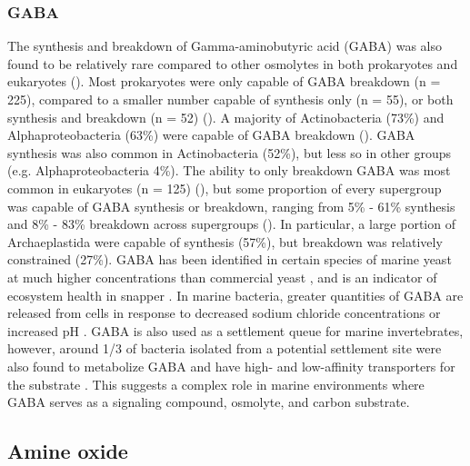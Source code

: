 \documentclass[utf8]{frontiersSCNS} %
\begin{document}
\subsubsection*{GABA}
The synthesis and breakdown of Gamma-aminobutyric acid (GABA) was also found to be relatively rare compared to other osmolytes in both prokaryotes and eukaryotes (). Most prokaryotes were only capable of GABA breakdown (n = 225), compared to a smaller number capable of synthesis only (n = 55), or both synthesis and breakdown (n = 52) (). A majority of Actinobacteria (73\%) and Alphaproteobacteria (63\%) were capable of GABA breakdown (). GABA synthesis was also common in Actinobacteria (52\%), but less so in other groups (e.g. Alphaproteobacteria 4\%). The ability to only breakdown GABA was most common in eukaryotes (n = 125) (), but some proportion of every supergroup was capable of GABA synthesis or breakdown, ranging from 5\% - 61\% synthesis and 8\% - 83\% breakdown across supergroups (). In particular, a large portion of Archaeplastida were capable of synthesis (57\%), but breakdown was relatively constrained (27\%). GABA has been identified in certain species of marine yeast at much higher concentrations than commercial yeast \citep{Masuda2008}, and is an indicator of ecosystem health in snapper \citep{Goode2020}. In marine bacteria, greater quantities of GABA are released from cells in response to decreased sodium chloride concentrations or increased pH \citep{Mountfort1992}. GABA is also used as a settlement queue for marine invertebrates, however, around 1/3 of bacteria isolated from a potential settlement site were also found to metabolize GABA and have high- and low-affinity transporters for the substrate \citep{Kaspar1991}. This suggests a complex role in marine environments where GABA serves as a signaling compound, osmolyte, and carbon substrate.

\subsection{Amine oxide}
\end{document}
